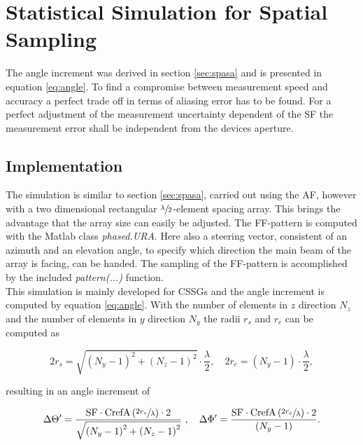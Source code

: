 \chapter{Statistical Simulation for Spatial Sampling}

The angle increment was derived in section \ref{sec:spasa} and is presented in equation \ref{eq:angle}. To find a compromise between measurement speed and accuracy a perfect trade off in terms of aliasing error has to be found. For a perfect adjustment of the measurement uncertainty dependent of the \ac{SF} the measurement error shall be independent from the devices aperture.

\section{Implementation}

The simulation is similar to section \ref{sec:spasa}, carried out using the \ac{AF}, however with a two dimensional rectangular $\sfrac{\lambda}{2}$-element spacing array. This brings the advantage that the array size can easily be adjusted. The \ac{FF}-pattern is computed with the Matlab\texttrademark{} class \textit{phased.URA}. Here also a steering vector, consistent of an azimuth and an elevation angle, to specify which direction the main beam of the array is facing, can be handed. The sampling of the \ac{FF}-pattern is accomplished by the included \textit{pattern(...)} function.\\
This simulation is mainly developed for \acp{CSSG} and the angle increment is computed by equation \ref{eq:angle}. With the number of elements in $z$ direction $N_z$ and the number of elements in $y$ direction $N_y$ the radii $r_s$ and $r_c$ can be computed as

\begin{equation}
2r_s = \sqrt{\left(N_y-1\right)^2+\left(N_z-1\right)^2}\cdot\frac{\lambda}{2},\quad 2r_c=\left(N_y-1\right)\cdot\frac{\lambda}{2},
\end{equation}

resulting in an angle increment of

\begin{equation}
\Delta\Theta^\prime = \frac{\text{SF}\cdot\text{CrefA}\left(\sfrac{2r_s}{\lambda}\right)\cdot 2}{\sqrt{\left(N_y-1\right)^2+\left(N_z-1\right)^2}}\ ,\quad\Delta\Phi^\prime = \frac{\text{SF}\cdot\text{CrefA}\left(\sfrac{2r_c}{\lambda}\right)\cdot 2}{\left(N_y-1\right)}.
\end{equation}

